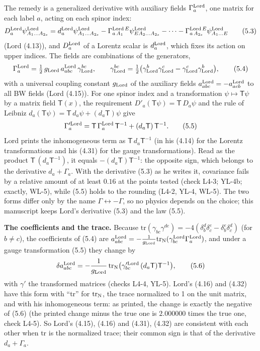 \documentclass[
  10pt,
]{article}
\begin{document}
The remedy is a generalized derivative with auxiliary fields
\(\Gamma^{\rm Lord}_a\), one matrix for each label \(a\), acting on each
spinor index:
\[D^{\rm Lord}_a\psi^{\rm Lord}_{A_1\dots A_{2s}}=d^{\rm Lord}_a\psi^{\rm Lord}_{A_1\dots A_{2s}}-\Gamma^{{\rm Lord}\,E}_{a\,A_1}\psi^{\rm Lord}_{EA_2\dots A_{2s}}-\dots-\Gamma^{{\rm Lord}\,E}_{a\,A_{2s}}\psi^{\rm Lord}_{A_1\dots E}\tag{5.3}\]
(Lord (4.13)), and \(D^{\rm Lord}_a\) of a Lorentz scalar is
\(d^{\rm Lord}_a\), which fixes its action on upper indices. The fields
are combinations of the generators,
\[\Gamma^{\rm Lord}_a=\tfrac12\,g_{\rm Lord}\,a^{\rm Lord}_{abc}\,\gamma^{bc}_{\rm Lord},\qquad\gamma^{bc}_{\rm Lord}=\tfrac12\big(\gamma^b_{\rm Lord}\gamma^c_{\rm Lord}-\gamma^c_{\rm Lord}\gamma^b_{\rm Lord}\big),\tag{5.4}\]
with a universal coupling constant \(g_{\rm Lord}\) of the auxiliary
fields \(a^{\rm Lord}_{abc}=-a^{\rm Lord}_{acb}\) to all BW fields (Lord
(4.15)). For one spinor index and a transformation
\(\psi\mapsto\mathsf T\psi\) by a matrix field \(\mathsf T(x)\), the
requirement \(D'_a(\mathsf T\psi)=\mathsf T\,D_a\psi\) and the rule of
Leibniz \(d_a(\mathsf T\psi)=\mathsf T\,d_a\psi+(d_a\mathsf T)\psi\)
give
\[\Gamma'^{\rm Lord}_a=\mathsf T\,\Gamma^{\rm Lord}_a\,\mathsf T^{-1}+(d_a\mathsf T)\,\mathsf T^{-1}.\tag{5.5}\]
Lord prints the inhomogeneous term as \(\mathsf T\,d_a\mathsf T^{-1}\)
(in his (4.14) for the Lorentz transformations and his (4.31) for the
gauge transformations). Read as the product
\(\mathsf T\,(d_a\mathsf T^{-1})\), it equals
\(-(d_a\mathsf T)\mathsf T^{-1}\): the opposite sign, which belongs to
the derivative \(d_a+\Gamma_a\). With the derivative (5.3) as he writes
it, covariance fails by a relative amount of at least \(0.16\) at the
points tested (check L4-3; YL-4b; exactly, WL-5), while (5.5) holds to
the rounding (L4-2, YL-4, WL-5). The two forms differ only by the name
\(\Gamma\leftrightarrow-\Gamma\), so no physics depends on the choice;
this manuscript keeps Lord's derivative (5.3) and the law (5.5).

\textbf{The coefficients and the trace.} Because
\(\mathrm{tr}(\gamma_{bc}\gamma^{de})=-4(\delta_b^d\delta_c^e-\delta_b^e\delta_c^d)\)
(for \(b\neq c\)), the coefficients of (5.4) are
\(a^{\rm Lord}_{abc}=-\frac1{g_{\rm Lord}}\mathrm{tr}_{\rm N}(\gamma^{\rm Lord}_{bc}\Gamma^{\rm Lord}_a)\),
and under a gauge transformation (5.5) they change by
\[\delta a^{\rm Lord}_{abc}=-\frac1{g_{\rm Lord}}\,\mathrm{tr}_{\rm N}\big(\gamma'^{\rm Lord}_{bc}\,(d_a\mathsf T)\mathsf T^{-1}\big),\tag{5.6}\]
with \(\gamma'\) the transformed matrices (checks L4-4, YL-5). Lord's
(4.16) and (4.32) have this form with ``tr'' for
\(\mathrm{tr}_{\rm N}\), the trace normalized to 1 on the unit matrix,
and with his inhomogeneous term: as printed, the change is exactly the
negative of (5.6) (the printed change minus the true one is \(2.000000\)
times the true one, check L4-5). So Lord's (4.15), (4.16) and (4.31),
(4.32) are consistent with each other when tr is the normalized trace;
their common sign is that of the derivative \(d_a+\Gamma_a\).
\end{document}
